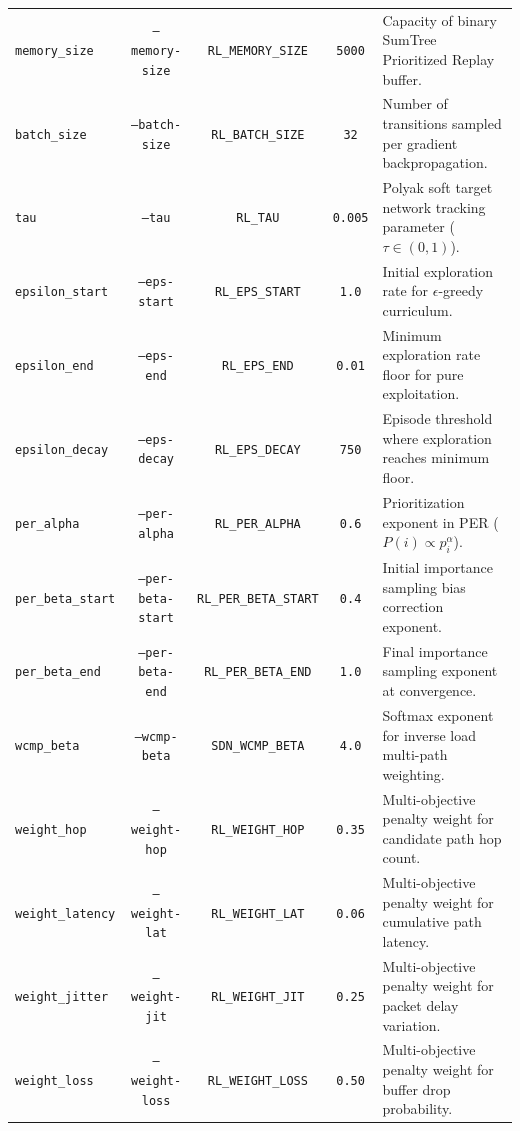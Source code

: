 \begin{table}[htbp]
\begin{tabularx}{\textwidth}{l c c c X}
\texttt{memory\_size} & \texttt{--memory-size} & \texttt{RL\_MEMORY\_SIZE} & \texttt{5000} & Capacity of binary SumTree Prioritized Replay buffer. \\
\texttt{batch\_size} & \texttt{--batch-size} & \texttt{RL\_BATCH\_SIZE} & \texttt{32} & Number of transitions sampled per gradient backpropagation. \\
\texttt{tau} & \texttt{--tau} & \texttt{RL\_TAU} & \texttt{0.005} & Polyak soft target network tracking parameter ($\tau \in (0, 1)$). \\
\texttt{epsilon\_start} & \texttt{--eps-start} & \texttt{RL\_EPS\_START} & \texttt{1.0} & Initial exploration rate for $\epsilon$-greedy curriculum. \\
\texttt{epsilon\_end} & \texttt{--eps-end} & \texttt{RL\_EPS\_END} & \texttt{0.01} & Minimum exploration rate floor for pure exploitation. \\
\texttt{epsilon\_decay} & \texttt{--eps-decay} & \texttt{RL\_EPS\_DECAY} & \texttt{750} & Episode threshold where exploration reaches minimum floor. \\
\texttt{per\_alpha} & \texttt{--per-alpha} & \texttt{RL\_PER\_ALPHA} & \texttt{0.6} & Prioritization exponent in PER ($P(i) \propto p_i^\alpha$). \\
\texttt{per\_beta\_start} & \texttt{--per-beta-start} & \texttt{RL\_PER\_BETA\_START} & \texttt{0.4} & Initial importance sampling bias correction exponent. \\
\texttt{per\_beta\_end} & \texttt{--per-beta-end} & \texttt{RL\_PER\_BETA\_END} & \texttt{1.0} & Final importance sampling exponent at convergence. \\
\addlinespace
\texttt{wcmp\_beta} & \texttt{--wcmp-beta} & \texttt{SDN\_WCMP\_BETA} & \texttt{4.0} & Softmax exponent for inverse load multi-path weighting. \\
\texttt{weight\_hop} & \texttt{--weight-hop} & \texttt{RL\_WEIGHT\_HOP} & \texttt{0.35} & Multi-objective penalty weight for candidate path hop count. \\
\texttt{weight\_latency} & \texttt{--weight-lat} & \texttt{RL\_WEIGHT\_LAT} & \texttt{0.06} & Multi-objective penalty weight for cumulative path latency. \\
\texttt{weight\_jitter} & \texttt{--weight-jit} & \texttt{RL\_WEIGHT\_JIT} & \texttt{0.25} & Multi-objective penalty weight for packet delay variation. \\
\texttt{weight\_loss} & \texttt{--weight-loss} & \texttt{RL\_WEIGHT\_LOSS} & \texttt{0.50} & Multi-objective penalty weight for buffer drop probability. \\

\end{tabularx}
\end{table}
